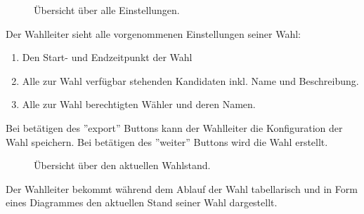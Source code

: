 \documentclass[parskip=full,11pt,twoside]{scrartcl}
\begin{document}
\begin{figure}[H]
	\caption{\label{fig:wlltr-done}
		Übersicht über alle Einstellungen.
	}
\end{figure}
Der Wahlleiter sieht alle vorgenommenen Einstellungen seiner Wahl:
\begin{enumerate}
	\item Den Start- und Endzeitpunkt der Wahl
	\item Alle zur Wahl verfügbar stehenden Kandidaten inkl. Name und Beschreibung.
	\item Alle zur Wahl berechtigten Wähler und deren Namen.
\end{enumerate}
Bei betätigen des ''export'' Buttons kann der Wahlleiter die Konfiguration der Wahl speichern.
Bei betätigen des ''weiter'' Buttons wird die Wahl erstellt.

\begin{figure}[H]
	\caption{\label{fig:wlltr-status}
		Übersicht über den aktuellen Wahlstand.
	}
\end{figure}
Der Wahlleiter bekommt während dem Ablauf der Wahl tabellarisch und in Form eines Diagrammes den aktuellen Stand seiner Wahl dargestellt.
\end{document}
